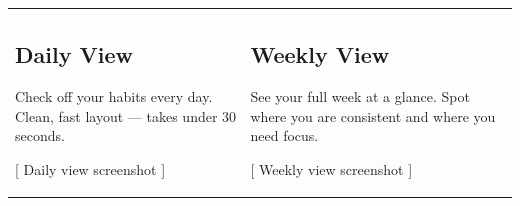\documentclass[10pt, a4paper]{article}
\begin{document}
\noindent
\begin{tabularx}{\textwidth}{@{}XX@{}}

  \begin{minipage}[t]{\linewidth}
    \subsection{Daily View}
    {\fontsize{9}{12}\selectfont
    Check off your habits every day. Clean, fast layout --- takes under 30 seconds.}
    \vspace{4pt}
    \begin{tcolorbox}[
      enhanced, colback=subtle, colframe=border,
      arc=5pt, boxrule=0.5pt, height=36mm,
      valign=center, halign=center,
      fontupper=\fontsize{8}{10}\selectfont\itshape\color{muted},
    ]
      {[} Daily view screenshot {]}
    \end{tcolorbox}
  \end{minipage}

  &

  \begin{minipage}[t]{\linewidth}
    \subsection{Weekly View}
    {\fontsize{9}{12}\selectfont
    See your full week at a glance. Spot where you are consistent and where you need focus.}
    \vspace{4pt}
    \begin{tcolorbox}[
      enhanced, colback=subtle, colframe=border,
      arc=5pt, boxrule=0.5pt, height=36mm,
      valign=center, halign=center,
      fontupper=\fontsize{8}{10}\selectfont\itshape\color{muted},
    ]
      {[} Weekly view screenshot {]}
    \end{tcolorbox}
  \end{minipage}

\end{tabularx}

\vspace{8pt}
\end{document}
